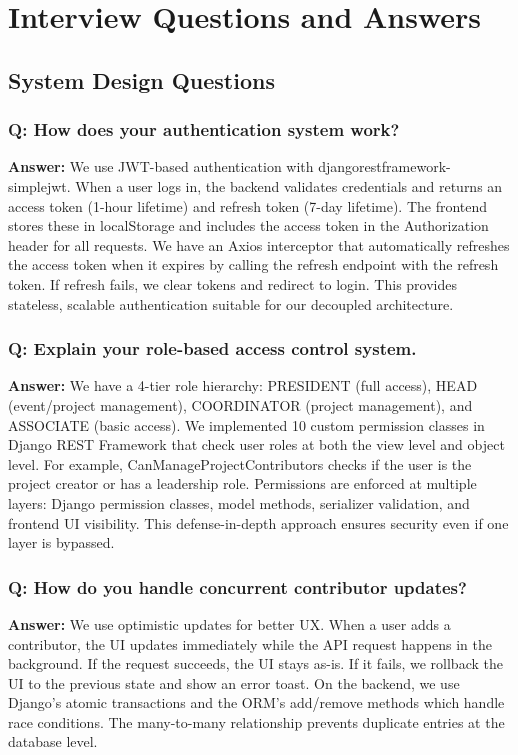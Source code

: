 \documentclass[11pt,a4paper]{article}
\begin{document}
\section{Interview Questions and Answers}

\subsection{System Design Questions}

\subsubsection{Q: How does your authentication system work?}
\textbf{Answer:} We use JWT-based authentication with djangorestframework-simplejwt. When a user logs in, the backend validates credentials and returns an access token (1-hour lifetime) and refresh token (7-day lifetime). The frontend stores these in localStorage and includes the access token in the Authorization header for all requests. We have an Axios interceptor that automatically refreshes the access token when it expires by calling the refresh endpoint with the refresh token. If refresh fails, we clear tokens and redirect to login. This provides stateless, scalable authentication suitable for our decoupled architecture.

\subsubsection{Q: Explain your role-based access control system.}
\textbf{Answer:} We have a 4-tier role hierarchy: PRESIDENT (full access), HEAD (event/project management), COORDINATOR (project management), and ASSOCIATE (basic access). We implemented 10 custom permission classes in Django REST Framework that check user roles at both the view level and object level. For example, CanManageProjectContributors checks if the user is the project creator or has a leadership role. Permissions are enforced at multiple layers: Django permission classes, model methods, serializer validation, and frontend UI visibility. This defense-in-depth approach ensures security even if one layer is bypassed.

\subsubsection{Q: How do you handle concurrent contributor updates?}
\textbf{Answer:} We use optimistic updates for better UX. When a user adds a contributor, the UI updates immediately while the API request happens in the background. If the request succeeds, the UI stays as-is. If it fails, we rollback the UI to the previous state and show an error toast. On the backend, we use Django's atomic transactions and the ORM's add/remove methods which handle race conditions. The many-to-many relationship prevents duplicate entries at the database level.
\end{document}
